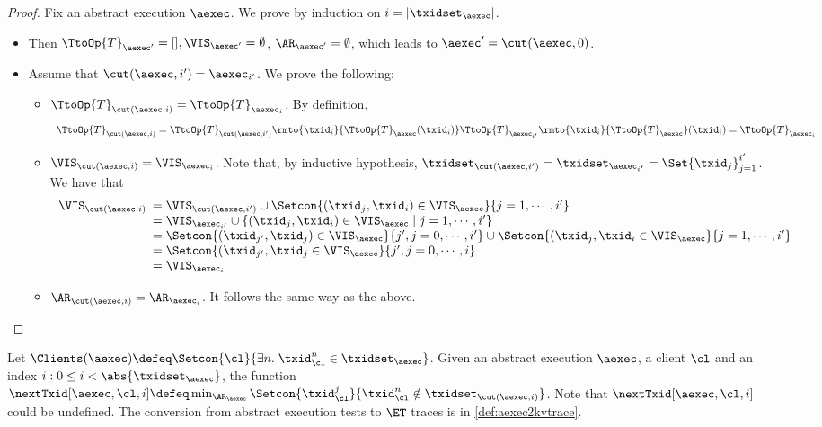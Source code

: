\begin{proof}
Fix an abstract execution $\aexec$. We prove by induction on $i = \lvert \txidset_{\aexec} \rvert$.
\begin{itemize}
\item {} Then $\TtoOp{T}_{\aexec'} = [], \VIS_{\aexec'} = \emptyset$, 
$\AR_{\aexec'} = \emptyset$, which leads to $\aexec' = \cut(\aexec, 0)$. 
\item {} 
Assume that $\cut(\aexec, i') = \aexec_{i'}$. 
We prove the following: 
\begin{itemize}
\item $\TtoOp{T}_{\cut(\aexec, i)} = \TtoOp{T}_{\aexec_i}$. 
By definition, 
\[
    \begin{array}{l}
\TtoOp{T}_{\cut(\aexec,i)} = \TtoOp{T}_{\cut(\aexec, i')}\rmto{\txid_{i}}{\TtoOp{T}_{\aexec}(\txid_{i})} 
\TtoOp{T}_{\aexec_{i'}}\rmto{\txid_{i}}{\TtoOp{T}_{\aexec}}(\txid_{i}) = \TtoOp{T}_{\aexec_{i}}
\end{array}
\]
\item $\VIS_{\cut(\aexec, i)} = \VIS_{\aexec_{i}}$. 
Note that, by inductive hypothesis, $\txidset_{\cut(\aexec, i')} = \txidset_{\aexec_{i'}} = \Set{\txid_{j}}_{j=1}^{i'}$. 
We have that  
\[
\begin{array}{l}
    \VIS_{\cut(\aexec, i)}
    \begin{array}[t]{l}
    = \VIS_{\cut(\aexec, i')} \cup \Setcon{(\txid_j, \txid_{i}) \in \VIS_{\aexec} }{ j = 1,\cdots, i'} \\ 
    = \VIS_{\aexec_{i'}} \cup \{(\txid_{j}, \txid_{i}) \in \VIS_{\aexec} \mid j=1,\cdots, i'\} \\ 
    = \Setcon{(\txid_{j'}, \txid_{j}) \in \VIS_{\aexec} }{ j', j = 0,\cdots, i'} \cup \Setcon{(\txid_{j}, \txid_{i} \in \VIS_{\aexec} }{ j=1,\cdots, i'} \\
    = \Setcon{(\txid_{j'}, \txid_{j} \in \VIS_{\aexec}  }{ j',j = 0,\cdots, i} \\
    = \VIS_{\aexec_{i}}
    \end{array}
\end{array}
\]
\item $\AR_{\cut(\aexec, i)} = \AR_{\aexec_{i}}$. It follows the same way 
as the above. 
\end{itemize}
\end{itemize}
\end{proof}

Let $\Clients(\aexec) \defeq \Setcon{\cl }{ \exists n.\;\txid_{\cl}^{n} \in \txidset_{\aexec}}$.
Given an abstract execution $\aexec$, a client $\cl$ and an index $i : 0 \leq i < \abs{\txidset_\aexec}$,
the function $\nextTxid[\aexec, \cl, i] \defeq \min_{\AR_{\aexec}} \Setcon{\txid_{\cl}^{j} }{ \txid_{\cl}^{n} \notin \txidset_{\cut(\aexec, i)}}$. 
Note that $\nextTxid[\aexec, \cl, i]$ could be undefined. 
The conversion from abstract execution tests to \( \ET \) traces is in \cref{def:aexec2kvtrace}.

